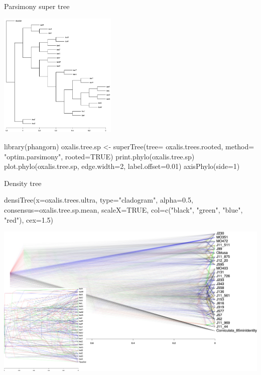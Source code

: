 \documentclass[compress, ucs, xelatex, 11pt, xcolor=svgnames,
  hyperref={
    bookmarks=true,
    unicode=true,
    colorlinks=true,
    pdftitle={Molecular data in R},
    plainpages=false,
    pdfauthor={Vojtech Zeisek},
    pdfsubject={Course about phylogeny and evolution in R},
    pdfcreator={XeLaTeX},
    pdfkeywords={R, evolution, phylogeny, molecular data},
    linkcolor=Tomato,
    anchorcolor=SaddleBrown,
    citecolor=Goldenrod,
    filecolor=DarkMagenta,
    menucolor=Sienna,
    urlcolor=DarkTurquoise,
    pdftex},
  url={hyphens, lowtilde} %
  ]{beamer}
\begin{document}
\begin{frame}[fragile]{Parsimony super tree}
\begin{multicols}{2}
  \includegraphics[height=6cm]{oxalis-pars.png}
  \begin{spluscode}
    library(phangorn)
    oxalis.tree.sp <- superTree(tree=
      oxalis.trees.rooted, method=
      "optim.parsimony", rooted=TRUE)
    print.phylo(oxalis.tree.sp)
    plot.phylo(oxalis.tree.sp,
      edge.width=2, label.offset=0.01)
    axisPhylo(side=1)
  \end{spluscode}
\end{multicols}
\end{frame}

\begin{frame}[fragile]{Density tree}
  \begin{spluscode}
    densiTree(x=oxalis.trees.ultra, type="cladogram", alpha=0.5,
      consensus=oxalis.tree.sp.mean, scaleX=TRUE, col=c("black",
      "green", "blue", "red"), cex=1.5)
  \end{spluscode}
\begin{center}
  \includegraphics[width=\textwidth-1.5cm]{oxalis_density_good.png}
\end{center}
\end{frame}
\end{document}
